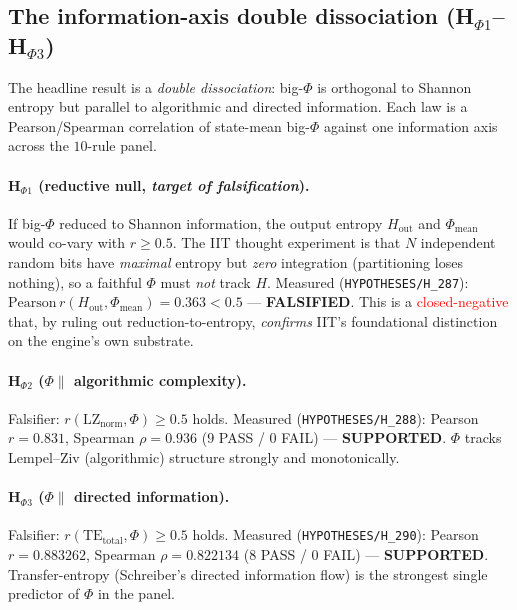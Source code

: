 \subsection{The information-axis double dissociation (H$_{\Phi 1}$--H$_{\Phi 3}$)}
\label{app:phi-info}

The headline result is a \emph{double dissociation}: big-$\Phi$ is orthogonal
to Shannon entropy but parallel to algorithmic and directed information. Each
law is a Pearson/Spearman correlation of state-mean big-$\Phi$ against one
information axis across the $10$-rule panel.

\paragraph{H$_{\Phi 1}$ (reductive null, \emph{target of falsification}).} If
big-$\Phi$ reduced to Shannon information, the output entropy $H_\text{out}$ and
$\Phi_\text{mean}$ would co-vary with $r\ge0.5$. The IIT thought experiment is
that $N$ independent random bits have \emph{maximal} entropy but \emph{zero}
integration (partitioning loses nothing), so a faithful $\Phi$ must \emph{not}
track $H$. Measured (\texttt{HYPOTHESES/H\_287}): $\mathrm{Pearson}\,r(H_\text{out},
\Phi_\text{mean})=\mathbf{0.363}<0.5$ --- \textbf{FALSIFIED}. This is a
\textcolor{red}{closed-negative} that, by ruling out reduction-to-entropy,
\emph{confirms} IIT's foundational distinction on the engine's own substrate.

\paragraph{H$_{\Phi 2}$ ($\Phi\parallel$ algorithmic complexity).} Falsifier:
$r(\mathrm{LZ}_\text{norm},\Phi)\ge0.5$ holds. Measured
(\texttt{HYPOTHESES/H\_288}): Pearson $r=\mathbf{0.831}$, Spearman
$\rho=\mathbf{0.936}$ ($9$ PASS / $0$ FAIL) --- \textbf{SUPPORTED}. $\Phi$ tracks
Lempel--Ziv (algorithmic) structure strongly and monotonically.

\paragraph{H$_{\Phi 3}$ ($\Phi\parallel$ directed information).} Falsifier:
$r(\mathrm{TE}_\text{total},\Phi)\ge0.5$ holds. Measured
(\texttt{HYPOTHESES/H\_290}): Pearson $r=\mathbf{0.883262}$, Spearman
$\rho=\mathbf{0.822134}$ ($8$ PASS / $0$ FAIL) --- \textbf{SUPPORTED}.
Transfer-entropy (Schreiber's directed information flow) is the strongest single
predictor of $\Phi$ in the panel.


